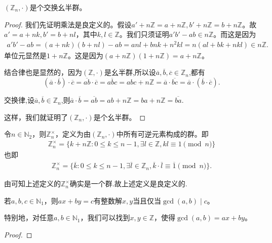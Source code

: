\documentclass[../../main.tex]{subfiles}
\begin{document}
\begin{proposition}\label{proposition:Z_n是一个交换幺半群}
$(\mathbb{Z}_n, \cdot)$是个交换幺半群。
\end{proposition}
\begin{proof}
我们先证明乘法是良定义的。假设$a' + n\mathbb{Z} = a + n\mathbb{Z}, b' + n\mathbb{Z} = b + n\mathbb{Z}$。故$a' = a + nk, b' = b + nl$，其中$k, l \in \mathbb{Z}$。我们只须证明$a'b' - ab \in n\mathbb{Z}$。而这是因为
\begin{align*}
a'b' - ab = (a + nk)(b + nl) - ab 
= anl + bnk + n^2kl 
= n(al + bk + nkl) \in n\mathbb{Z} .
\end{align*}
单位元显然是$1 + n\mathbb{Z}$。这是因为$(a + n\mathbb{Z})(1 + n\mathbb{Z}) = a + n\mathbb{Z}$。

结合律也是显然的，因为$(\mathbb{Z}, \cdot)$是幺半群,所以设$\overline{a},\overline{b},\overline{c}\in \mathbb{Z} _n$,都有
\[
\left( \overline{a}\cdot \overline{b} \right) \cdot \overline{c}=\overline{ab}\cdot \overline{c}=\overline{abc}=abc+n\mathbb{Z} =\overline{a}\cdot \overline{bc}=\overline{a}\cdot \left( \overline{b}\cdot \overline{c} \right) .
\]

交换律,设$\overline{a},\overline{b}\in \mathbb{Z} _n$,则$\overline{a}\cdot \overline{b}=\overline{ab}=ab+n\mathbb{Z} =ba+n\mathbb{Z} =\overline{ba}.$

这样，我们就证明了$(\mathbb{Z}_n, \cdot)$是个幺半群。

\end{proof}

\begin{definition}
令$n \in \mathbb{N}_2$，则$\mathbb{Z}_n^\times$，定义为由$(\mathbb{Z}_n, \cdot)$中所有可逆元素构成的群。即
\begin{align*}
\mathbb{Z}_n^\times = \{k + n\mathbb{Z} : 0 \leqslant k \leqslant n - 1, \exists l \in \mathbb{Z}, kl \equiv 1 \pmod{n}\}
\end{align*}
也即
\begin{align*}
\mathbb{Z} _{n}^{\times}=\{\overline{k}:0\leqslant k\leqslant n-1,\exists \overline{l}\in \mathbb{Z} _n,\overline{k}\cdot \overline{l}\equiv \overline{1} \pmod{n} \}.
\end{align*}
\end{definition}
\begin{remark}
由可知上述定义的$\mathbb{Z}_n^\times$确实是一个群.故上述定义是良定义的.
\end{remark}

\begin{lemma}[Bézout定理]\label{lemma:Bézout定理}
若$a, b, c \in \mathbb{N}_1$，则$ax + by = c$有整数解$x, y$当且仅当$\gcd(a, b) \mid c$。

特别地，对任意$a, b \in \mathbb{N}_1$，我们可以找到$x, y \in \mathbb{Z}$，使得$\gcd(a, b) = ax + by$。
\end{lemma}
\begin{proof}


\end{proof}
\end{document}
